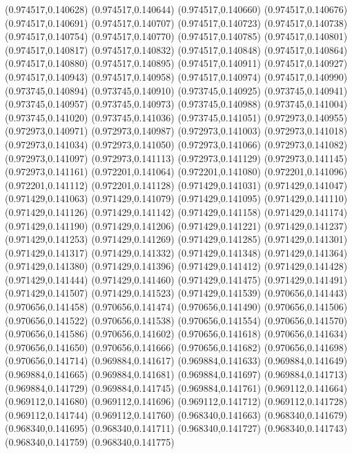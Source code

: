 (0.974517,0.140628)
(0.974517,0.140644)
(0.974517,0.140660)
(0.974517,0.140676)
(0.974517,0.140691)
(0.974517,0.140707)
(0.974517,0.140723)
(0.974517,0.140738)
(0.974517,0.140754)
(0.974517,0.140770)
(0.974517,0.140785)
(0.974517,0.140801)
(0.974517,0.140817)
(0.974517,0.140832)
(0.974517,0.140848)
(0.974517,0.140864)
(0.974517,0.140880)
(0.974517,0.140895)
(0.974517,0.140911)
(0.974517,0.140927)
(0.974517,0.140943)
(0.974517,0.140958)
(0.974517,0.140974)
(0.974517,0.140990)
(0.973745,0.140894)
(0.973745,0.140910)
(0.973745,0.140925)
(0.973745,0.140941)
(0.973745,0.140957)
(0.973745,0.140973)
(0.973745,0.140988)
(0.973745,0.141004)
(0.973745,0.141020)
(0.973745,0.141036)
(0.973745,0.141051)
(0.972973,0.140955)
(0.972973,0.140971)
(0.972973,0.140987)
(0.972973,0.141003)
(0.972973,0.141018)
(0.972973,0.141034)
(0.972973,0.141050)
(0.972973,0.141066)
(0.972973,0.141082)
(0.972973,0.141097)
(0.972973,0.141113)
(0.972973,0.141129)
(0.972973,0.141145)
(0.972973,0.141161)
(0.972201,0.141064)
(0.972201,0.141080)
(0.972201,0.141096)
(0.972201,0.141112)
(0.972201,0.141128)
(0.971429,0.141031)
(0.971429,0.141047)
(0.971429,0.141063)
(0.971429,0.141079)
(0.971429,0.141095)
(0.971429,0.141110)
(0.971429,0.141126)
(0.971429,0.141142)
(0.971429,0.141158)
(0.971429,0.141174)
(0.971429,0.141190)
(0.971429,0.141206)
(0.971429,0.141221)
(0.971429,0.141237)
(0.971429,0.141253)
(0.971429,0.141269)
(0.971429,0.141285)
(0.971429,0.141301)
(0.971429,0.141317)
(0.971429,0.141332)
(0.971429,0.141348)
(0.971429,0.141364)
(0.971429,0.141380)
(0.971429,0.141396)
(0.971429,0.141412)
(0.971429,0.141428)
(0.971429,0.141444)
(0.971429,0.141460)
(0.971429,0.141475)
(0.971429,0.141491)
(0.971429,0.141507)
(0.971429,0.141523)
(0.971429,0.141539)
(0.970656,0.141443)
(0.970656,0.141458)
(0.970656,0.141474)
(0.970656,0.141490)
(0.970656,0.141506)
(0.970656,0.141522)
(0.970656,0.141538)
(0.970656,0.141554)
(0.970656,0.141570)
(0.970656,0.141586)
(0.970656,0.141602)
(0.970656,0.141618)
(0.970656,0.141634)
(0.970656,0.141650)
(0.970656,0.141666)
(0.970656,0.141682)
(0.970656,0.141698)
(0.970656,0.141714)
(0.969884,0.141617)
(0.969884,0.141633)
(0.969884,0.141649)
(0.969884,0.141665)
(0.969884,0.141681)
(0.969884,0.141697)
(0.969884,0.141713)
(0.969884,0.141729)
(0.969884,0.141745)
(0.969884,0.141761)
(0.969112,0.141664)
(0.969112,0.141680)
(0.969112,0.141696)
(0.969112,0.141712)
(0.969112,0.141728)
(0.969112,0.141744)
(0.969112,0.141760)
(0.968340,0.141663)
(0.968340,0.141679)
(0.968340,0.141695)
(0.968340,0.141711)
(0.968340,0.141727)
(0.968340,0.141743)
(0.968340,0.141759)
(0.968340,0.141775)
